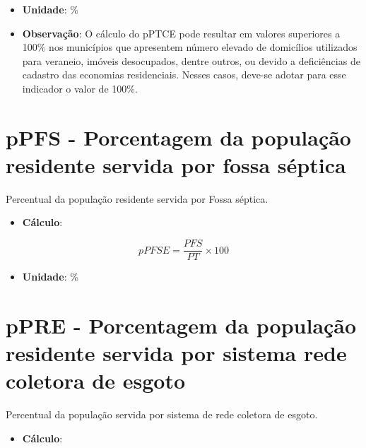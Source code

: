 \documentclass[]{book}
\providecommand{\tightlist}{%
  \setlength{\itemsep}{0pt}\setlength{\parskip}{0pt}}
\begin{document}
\begin{itemize}
\item
  \textbf{Unidade}: \%
\item
  \textbf{Observação}: O cálculo do pPTCE pode resultar em valores superiores a 100\% nos municípios que apresentem número elevado de domicílios utilizados para veraneio, imóveis desocupados, dentre outros, ou devido a deficiências de cadastro das economias residenciais. Nesses casos, deve-se adotar para esse indicador o valor de 100\%.
\end{itemize}

\hypertarget{ppfs---porcentagem-da-populauxe7uxe3o-residente-servida-por-fossa-suxe9ptica}{%
\section*{pPFS - Porcentagem da população residente servida por fossa séptica}\label{ppfs---porcentagem-da-populauxe7uxe3o-residente-servida-por-fossa-suxe9ptica}}

Percentual da população residente servida por Fossa séptica.

\begin{itemize}
\tightlist
\item
  \textbf{Cálculo}:
\end{itemize}

\[
pPFSE =\frac{PFS}{PT} \times 100
\]

\begin{itemize}
\tightlist
\item
  \textbf{Unidade}: \%
\end{itemize}

\hypertarget{ppre---porcentagem-da-populauxe7uxe3o-residente-servida-por-sistema-rede-coletora-de-esgoto}{%
\section*{pPRE - Porcentagem da população residente servida por sistema rede coletora de esgoto}\label{ppre---porcentagem-da-populauxe7uxe3o-residente-servida-por-sistema-rede-coletora-de-esgoto}}

Percentual da população servida por sistema de rede coletora de esgoto.

\begin{itemize}
\tightlist
\item
  \textbf{Cálculo}:
\end{itemize}
\end{document}
